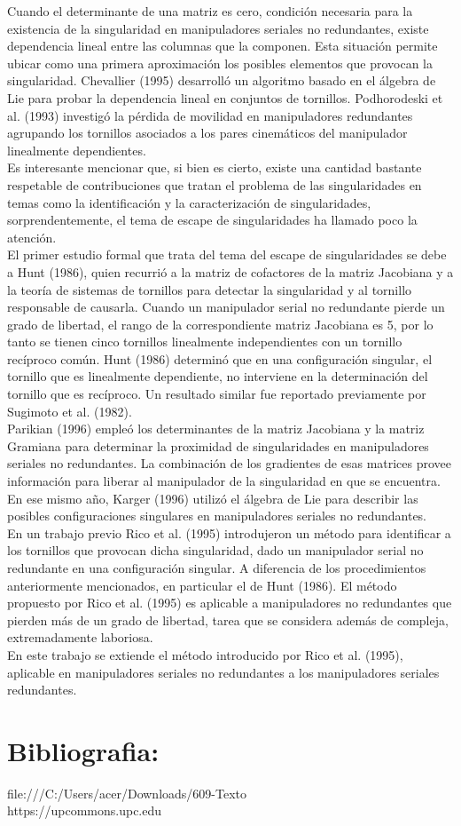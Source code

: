 \documentclass[12pt,a4paper]{article}
\begin{document}
Cuando el determinante de una matriz es cero, condición necesaria para la existencia de la singularidad en manipuladores seriales no redundantes, existe dependencia lineal entre las columnas que la componen. Esta situación permite ubicar como una primera aproximación los posibles elementos que provocan la singularidad. Chevallier (1995) desarrolló un algoritmo basado en el álgebra de Lie para probar la dependencia lineal en conjuntos de tornillos. Podhorodeski et al. (1993) investigó la pérdida de movilidad en manipuladores redundantes agrupando los tornillos asociados a los pares cinemáticos del manipulador linealmente dependientes. \\
Es interesante mencionar que, si bien es cierto, existe una cantidad bastante respetable de contribuciones que tratan el problema de las singularidades en temas como la identificación y la caracterización de singularidades, sorprendentemente, el tema de escape de singularidades ha llamado poco la atención. \\
El primer estudio formal que trata del tema del escape de singularidades se debe a Hunt (1986), quien recurrió a la matriz de cofactores de la matriz Jacobiana y a la teoría de sistemas de tornillos para detectar la singularidad y al tornillo responsable de causarla. Cuando un manipulador serial no redundante pierde un grado de libertad, el rango de la correspondiente matriz Jacobiana es 5, por lo tanto se tienen cinco tornillos linealmente independientes con un tornillo recíproco común. Hunt (1986) determinó que en una configuración singular, el tornillo que es linealmente dependiente, no interviene en la determinación del tornillo que es recíproco. Un resultado similar fue reportado previamente por Sugimoto et al. (1982). \\
Parikian (1996) empleó los determinantes de la matriz Jacobiana y la matriz Gramiana para determinar la proximidad de singularidades en manipuladores seriales no redundantes. La combinación de los gradientes de esas matrices provee información para liberar al manipulador de la singularidad en que se encuentra. En ese mismo año, Karger (1996) utilizó el álgebra de Lie para describir las posibles configuraciones singulares en manipuladores seriales no redundantes. \\
En un trabajo previo Rico et al. (1995) introdujeron un método para identificar a los tornillos que provocan dicha singularidad, dado un manipulador serial no redundante en una configuración singular. A diferencia de los procedimientos anteriormente mencionados, en particular el de Hunt (1986). El método propuesto por Rico et al. (1995) es aplicable a manipuladores no redundantes que pierden más de un grado de libertad, tarea que se considera además de compleja, extremadamente laboriosa.\\
En este trabajo se extiende el método introducido por Rico et al. (1995), aplicable en manipuladores seriales no redundantes a los manipuladores seriales redundantes.\\

\section{Bibliografia:}
file:///C:/Users/acer/Downloads/609-Texto\\
https://upcommons.upc.edu
\end{document}
